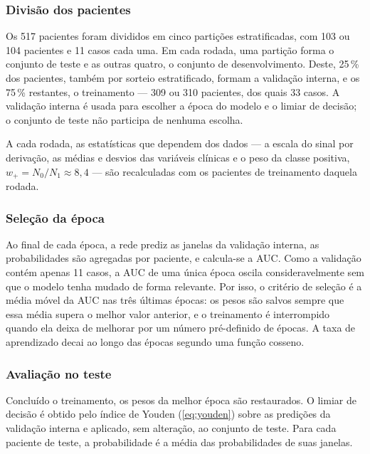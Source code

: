 \subsubsection{Divisão dos pacientes}

Os 517 pacientes foram divididos em cinco partições estratificadas, com 103
ou 104 pacientes e 11 casos cada uma. Em cada rodada, uma partição forma o
conjunto de teste e as outras quatro, o conjunto de desenvolvimento. Deste,
25\,\% dos pacientes, também por sorteio estratificado, formam a validação
interna, e os 75\,\% restantes, o treinamento --- 309 ou 310 pacientes, dos
quais 33 casos. A validação interna é usada para escolher a época do modelo
e o limiar de decisão; o conjunto de teste não participa de nenhuma escolha.

A cada rodada, as estatísticas que dependem dos dados --- a escala do sinal
por derivação, as médias e desvios das variáveis clínicas e o peso da classe
positiva, $w_{+} = N_0/N_1 \approx 8{,}4$ --- são recalculadas com os
pacientes de treinamento daquela rodada.

\subsubsection{Seleção da época}

Ao final de cada época, a rede prediz as janelas da validação interna, as
probabilidades são agregadas por paciente, e calcula-se a \gls{AUC}. Como a
validação contém apenas 11 casos, a \gls{AUC} de uma única época oscila
consideravelmente sem que o modelo tenha mudado de forma relevante. Por isso,
o critério de seleção é a média móvel da \gls{AUC} nas três últimas épocas:
os pesos são salvos sempre que essa média supera o melhor valor anterior, e
o treinamento é interrompido quando ela deixa de melhorar por um número
pré-definido de épocas. A taxa de aprendizado decai ao longo das épocas
segundo uma função cosseno.

\subsubsection{Avaliação no teste}

Concluído o treinamento, os pesos da melhor época são restaurados. O limiar
de decisão é obtido pelo índice de Youden (\autoref{eq:youden}) sobre as
predições da validação interna e aplicado, sem alteração, ao conjunto de
teste. Para cada paciente de teste, a probabilidade é a média das
probabilidades de suas janelas.

